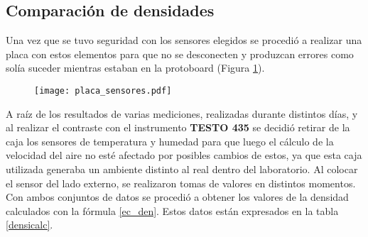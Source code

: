 \subsection{Comparación de densidades} \label{cap:densidades}

Una vez que se tuvo seguridad con los sensores elegidos se procedió a realizar una placa con estos elementos para que no se desconecten y produzcan errores como solía suceder mientras estaban en la protoboard (Figura \ref{fig:sensoresa}). \\
\begin{figure}[H]
	\centering
	\texttt{[image: placa\_sensores.pdf]}
	\label{fig:sensoresa}
\end{figure}

A raíz de los resultados de varias mediciones, realizadas durante distintos días, y al realizar el contraste con el instrumento \textbf{TESTO 435} se decidió retirar de la caja los sensores de temperatura y humedad para que luego el cálculo de la velocidad del aire no esté afectado por posibles cambios de estos, ya que esta caja utilizada generaba un ambiente distinto al real dentro del laboratorio. Al colocar el sensor del lado externo, se realizaron tomas de valores en distintos momentos. Con ambos conjuntos de datos se procedió a obtener los valores de la densidad calculados con la fórmula \ref{ec_den}. Estos datos están expresados en la tabla \ref{densicalc}. 


